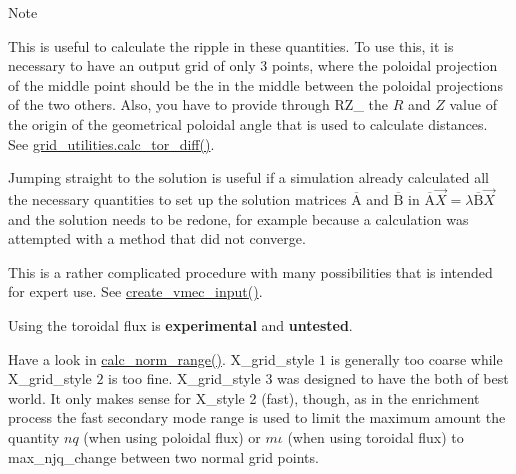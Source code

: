 \begin{DoxyNote}{Note}
\begin{DoxyEnumerate}
\item \label{page_inputs_fni32}%
%
This is useful to calculate the ripple in these quantities. To use this, it is necessary to have an output grid of only 3 points, where the poloidal projection of the middle point should be the in the middle between the poloidal projections of the two others. Also, you have to provide through {\ttfamily R\+Z\+\_} the $R$ and $Z$ value of the origin of the geometrical poloidal angle that is used to calculate distances. See \hyperlink{interfacegrid__utilities_1_1calc__tor__diff}{grid\+\_\+utilities.\+calc\+\_\+tor\+\_\+diff()}.
\item \label{page_inputs_fni33}%
%
Jumping straight to the solution is useful if a simulation already calculated all the necessary quantities to set up the solution matrices $\overline{\text{A}}$ and $\overline{\text{B}}$ in $\overline{\text{A}} \vec{X} = \lambda \overline{\text{B}} \vec{X}$ and the solution needs to be redone, for example because a calculation was attempted with a method that did not converge.
\item \label{page_inputs_fni34}%
%
This is a rather complicated procedure with many possibilities that is intended for expert use. See \hyperlink{namespaceeq__ops_a9addef683b3d4a8c587510e4c994ec61}{create\+\_\+vmec\+\_\+input()}.
\item \label{page_inputs_fni35}%
%
Using the toroidal flux is {\bfseries experimental} and {\bfseries untested}.
\item \label{page_inputs_fni36}%
%
Have a look in \hyperlink{namespacegrid__ops_a1c18f90f93f5fce7ebb4dba60b70e0f8}{calc\+\_\+norm\+\_\+range()}. {\ttfamily X\+\_\+grid\+\_\+style} $1$ is generally too coarse while {\ttfamily X\+\_\+grid\+\_\+style} $2$ is too fine. {\ttfamily X\+\_\+grid\+\_\+style} $3$ was designed to have the both of best world. It only makes sense for {\ttfamily X\+\_\+style} 2 (fast), though, as in the enrichment process the fast secondary mode range is used to limit the maximum amount the quantity $n q$ (when using poloidal flux) or $m \iota$ (when using toroidal flux) to {\ttfamily max\+\_\+njq\+\_\+change} between two normal grid points. 
\end{DoxyEnumerate}
\end{DoxyNote}
